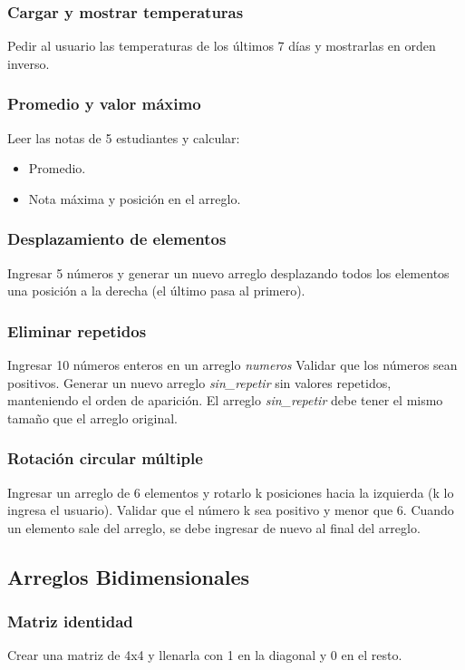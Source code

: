 \subsubsection{Cargar y mostrar temperaturas}
Pedir al usuario las temperaturas de los últimos 7 días y mostrarlas en orden inverso.
\subsubsection{Promedio y valor máximo}
Leer las notas de 5 estudiantes y calcular:
\begin{itemize}
    \item Promedio.
    \item Nota máxima y posición en el arreglo.
\end{itemize}
\subsubsection{Desplazamiento de elementos}
Ingresar 5 números y generar un nuevo arreglo desplazando todos los elementos una posición a la derecha (el último pasa al primero).

\subsubsection{Eliminar repetidos}
Ingresar 10 números enteros en un arreglo \textit{numeros}
Validar que los números sean positivos.
Generar un nuevo arreglo \textit{sin\_repetir} sin valores repetidos, manteniendo el orden de aparición.
El arreglo \textit{sin\_repetir} debe tener el mismo tamaño que el arreglo original.
\subsubsection{Rotación circular múltiple}
Ingresar un arreglo de 6 elementos y rotarlo k posiciones hacia la izquierda (k lo ingresa el usuario).
Validar que el número k sea positivo y menor que 6.
Cuando un elemento sale del arreglo, se debe ingresar de nuevo al final del arreglo.
\subsection*{Arreglos Bidimensionales}

\subsubsection{Matriz identidad}
Crear una matriz de 4x4 y llenarla con 1 en la diagonal y 0 en el resto.

